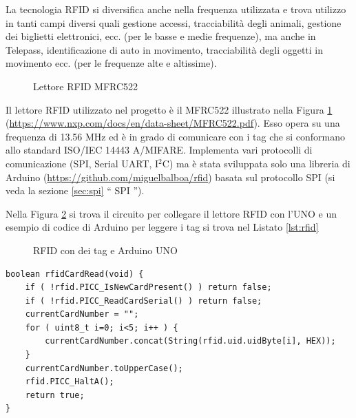 \documentclass[12pt]{report}
\begin{document}
La tecnologia RFID si diversifica anche nella frequenza utilizzata e trova utilizzo in tanti campi diversi quali gestione accessi, tracciabilità degli animali, gestione dei biglietti elettronici, ecc$.$ (per le basse e medie frequenze), ma anche in Telepass, identificazione di auto in movimento, tracciabilità degli oggetti in movimento ecc. (per le frequenze alte e altissime).

\begin{figure}
	\caption{Lettore RFID MFRC522}
	\label{fig:mfrc522}
\end{figure}

Il lettore RFID utilizzato nel progetto è il MFRC522 illustrato nella Figura \ref{fig:mfrc522} (\url{https://www.nxp.com/docs/en/data-sheet/MFRC522.pdf}). Esso opera su una frequenza di 13.56 MHz ed è in grado di comunicare con i tag che si conformano allo standard ISO/IEC 14443 A/MIFARE. Implementa vari protocolli di comunicazione (SPI, Serial UART, I$^2$C) ma è stata sviluppata solo una libreria di Arduino (\url{https://github.com/miguelbalboa/rfid}) basata sul protocollo SPI (si veda la sezione \ref{sec:spi} \textquotedblleft{} SPI \textquotedblright{}).

Nella Figura \ref{fig:rfid_uno} si trova il circuito per collegare il lettore RFID con l'UNO e un esempio di codice di Arduino per leggere i tag si trova nel Listato \ref{lst:rfid}

\begin{figure}[H]
	\caption{RFID con dei tag e Arduino UNO}
	\label{fig:rfid_uno}
\end{figure}

\pagebreak

\begin{lstlisting}[caption={Procedura per leggere i tag. I tag vengono letti un byte alla volta e poi vengono concatenati in una stringa.}, label={lst:rfid}]
boolean rfidCardRead(void) {
	if ( !rfid.PICC_IsNewCardPresent() ) return false;
	if ( !rfid.PICC_ReadCardSerial() ) return false;
	currentCardNumber = "";
	for ( uint8_t i=0; i<5; i++ ) {
		currentCardNumber.concat(String(rfid.uid.uidByte[i], HEX));
	}
	currentCardNumber.toUpperCase();
	rfid.PICC_HaltA(); 
	return true;
}
\end{lstlisting} 
\end{document}
